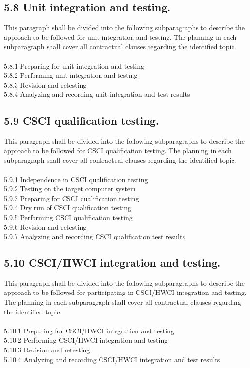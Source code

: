 \subsection{5.8 Unit integration and testing.}

This paragraph shall be divided into the following subparagraphs to
describe the approach to be followed for unit integration and testing.
The planning in each subparagraph shall cover all contractual clauses
regarding the identified topic. \\\\ 5.8.1 Preparing for unit
integration and testing \\ 5.8.2 Performing unit integration and testing
\\ 5.8.3 Revision and retesting \\ 5.8.4 Analyzing and recording unit
integration and test results

\subsection{5.9 CSCI qualification testing.}

This paragraph shall be divided into the following subparagraphs to
describe the approach to be followed for CSCI qualification testing. The
planning in each subparagraph shall cover all contractual clauses
regarding the identified topic. \\\\ 5.9.1 Independence in CSCI
qualification testing \\ 5.9.2 Testing on the target computer system \\
5.9.3 Preparing for CSCI qualification testing \\ 5.9.4 Dry run of CSCI
qualification testing \\ 5.9.5 Performing CSCI qualification testing \\
5.9.6 Revision and retesting \\ 5.9.7 Analyzing and recording CSCI
qualification test results

\subsection{5.10 CSCI/HWCI integration and testing.}

This paragraph shall be divided into the following subparagraphs to
describe the approach to be followed for participating in CSCI/HWCI
integration and testing. The planning in each subparagraph shall cover
all contractual clauses regarding the identified topic. \\\\ 5.10.1
Preparing for CSCI/HWCI integration and testing \\ 5.10.2 Performing
CSCI/HWCI integration and testing \\ 5.10.3 Revision and retesting \\
5.10.4 Analyzing and recording CSCI/HWCI integration and test results

